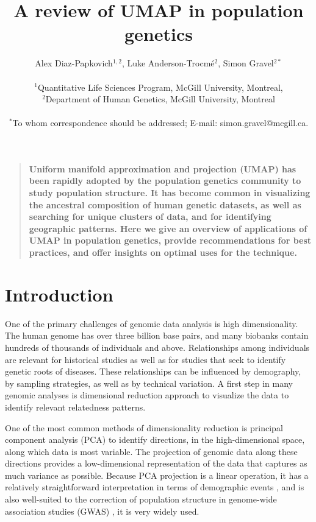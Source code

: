 \documentclass[12pt]{article}
\title{A review of UMAP in population genetics}
\author
{Alex Diaz-Papkovich$^{1,2}$, Luke Anderson-Trocm\'{e}$^{2}$, Simon Gravel$^{2\ast}$\\
\\
\normalsize{$^{1}$Quantitative Life Sciences Program, McGill University, Montreal,}\\
\normalsize{$^{2}$Department of Human Genetics, McGill University, Montreal}\\
\\
\normalsize{$^\ast$To whom correspondence should be addressed; E-mail:  simon.gravel@mcgill.ca.}
}
\date{}
\newenvironment{sciabstract}{%
\begin{quote} \bf}
{\end{quote}}
\begin{document}
 


\baselineskip24pt


\maketitle 



\begin{sciabstract}
Uniform manifold approximation and projection (UMAP) has been rapidly adopted by the population genetics community to study population structure. It has become common in visualizing the ancestral composition of human genetic datasets, as well as searching for unique clusters of data, and for identifying geographic patterns. Here we give an overview of applications of UMAP in population genetics, provide recommendations for best practices, and offer insights on optimal uses for the technique.
\end{sciabstract}

\section*{Introduction}

One of the primary challenges of genomic data analysis is high dimensionality. The human genome has over three billion base pairs, and many biobanks contain hundreds of thousands of individuals and above. Relationships among individuals are relevant for historical studies as well as for studies that seek to identify genetic roots of diseases. These relationships can be influenced by demography, by sampling strategies, as well as by technical variation. A first step in many genomic analyses is dimensional reduction approach to visualize the data to identify relevant relatedness patterns. 

One of the most common methods of dimensionality reduction is principal component analysis (PCA) to identify directions, in the high-dimensional space, along which data is most variable. The projection of genomic data along these directions provides a low-dimensional representation of the data that captures as much variance as possible. Because PCA projection is a linear operation, it has a relatively straightforward interpretation in terms of demographic events \cite{mcvean2009genealogical}, and is also well-suited to the correction of population structure in genome-wide association studies (GWAS) \cite{patterson2006population}, it is very widely used.
\end{document}
